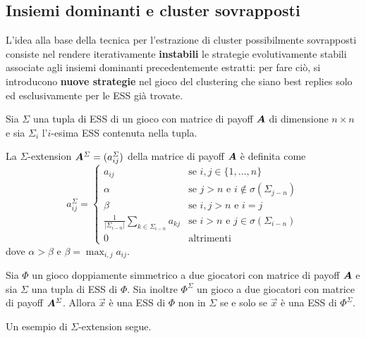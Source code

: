 \subsection{Insiemi dominanti e cluster sovrapposti}

L'idea alla base della tecnica per l'estrazione di cluster possibilmente sovrapposti consiste nel rendere iterativamente \textbf{instabili} le strategie evolutivamente stabili associate agli insiemi dominanti precedentemente estratti: per fare ciò, si introducono \textbf{nuove strategie} nel gioco del clustering che siano best replies solo ed esclusivamente per le ESS già trovate.

Sia $\Sigma$ una tupla di ESS di un gioco con matrice di payoff $\mat{A}$ di dimensione $n \times n$ e sia $\Sigma_i$ l'$i$-esima ESS contenuta nella tupla.

La $\Sigma$-extension $\mat{A}^\Sigma = (a_{ij}^\Sigma)$ della matrice di payoff $\mat{A}$ è definita come
\begin{displaymath}
	a_{ij}^\Sigma = \begin{cases}
		a_{ij} & \text{se } i, j \in \{1, \dots, n\} \\
		\alpha & \text{se } j > n \text{ e } i \notin \sigma(\Sigma_{j - n}) \\
		\beta & \text{se } i, j > n \text{ e } i = j \\
		\frac{1}{|\Sigma_{i - n}|} \sum_{k \in \Sigma_{i - n}} a_{kj} & \text{se } i > n \text{ e } j \in \sigma(\Sigma_{i - n}) \\
		0 & \text{altrimenti}
	\end{cases}
\end{displaymath}
dove $\alpha > \beta$ e $\beta = \max_{i, j} a_{ij}$.

\begin{thm}
	Sia $\Phi$ un gioco doppiamente simmetrico a due giocatori con matrice di payoff $\mat{A}$ e sia $\Sigma$ una tupla di ESS di $\Phi$. Sia inoltre $\Phi^\Sigma$ un gioco a due giocatori con matrice di payoff $\mat{A}^\Sigma$. Allora $\vec{x}$ è una ESS di $\Phi$ non in $\Sigma$ se e solo se $\vec{x}$ è una ESS di $\Phi^\Sigma$.
\end{thm}

\noindent Un esempio di $\Sigma$-extension segue.


